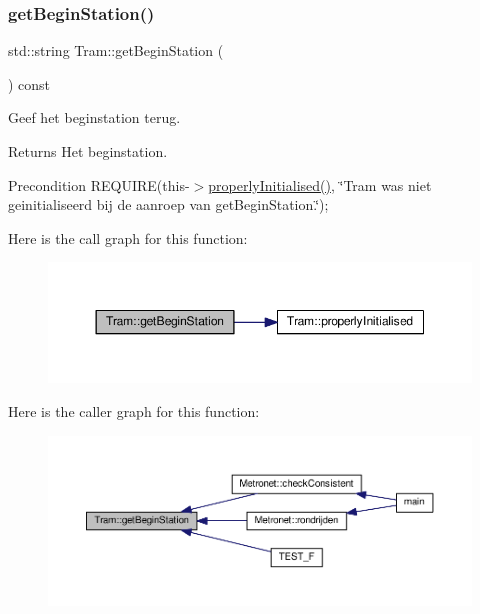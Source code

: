 \subsubsection{\texorpdfstring{get\+Begin\+Station()}{getBeginStation()}}
{\footnotesize\ttfamily std\+::string Tram\+::get\+Begin\+Station (\begin{DoxyParamCaption}{ }\end{DoxyParamCaption}) const}



Geef het beginstation terug. 

\begin{DoxyReturn}{Returns}
Het beginstation. 
\end{DoxyReturn}
\begin{DoxyPrecond}{Precondition}
R\+E\+Q\+U\+I\+RE(this-\/$>$\hyperlink{class_tram_ac2688f590e4db232b4f535c9bf959efb}{properly\+Initialised()}, \char`\"{}\+Tram was niet geinitialiseerd bij de aanroep van get\+Begin\+Station.\char`\"{}); 
\end{DoxyPrecond}
Here is the call graph for this function\+:\nopagebreak
\begin{figure}[H]
\begin{center}
\leavevmode
\includegraphics[width=350pt]{class_tram_ae4a7cf6313452140ed54d219d1f6afba_cgraph}
\end{center}
\end{figure}
Here is the caller graph for this function\+:\nopagebreak
\begin{figure}[H]
\begin{center}
\leavevmode
\includegraphics[width=350pt]{class_tram_ae4a7cf6313452140ed54d219d1f6afba_icgraph}
\end{center}
\end{figure}
\mbox{\label{class_tram_ae1d03c1fb6e0f5f97c57d35fe10fa8dd}} 

